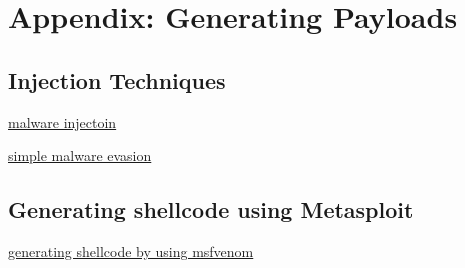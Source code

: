 \section*{Appendix: Generating Payloads}

\subsection*{Injection Techniques}

\href{https://cocomelonc.github.io/tutorial/2021/09/18/malware-injection-1.html}{malware injectoin}


\href{https://cocomelonc.github.io/tutorial/2021/09/04/simple-malware-av-evasion.html}{simple malware evasion}

\subsection*{Generating shellcode using Metasploit}

\href{https://stackoverflow.com/questions/42289112/generate-shellcode-by-using-msfvenom}{generating shellcode by using msfvenom}

